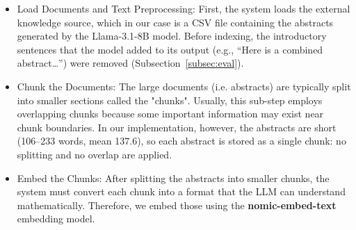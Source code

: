 \documentclass[bdcc,article,submit,pdftex,moreauthors]{Definitions/mdpi}
\newif\ifshowchanges
\newcommand{\commentRed}[1]{\textcolor{red}{#1}}
\newcommand{\commentVP}[1]{\textcolor{orange}{\textbf{VP:} #1}}
\newcommand{\commentGN}[1]{\textcolor{olive}{\textbf{GC:} #1}}
\newif\ifshowchanges
\begin{document}
\begin{itemize}
    \item Load Documents and Text Preprocessing: First, the system loads the external knowledge source, which in our case is a CSV file containing the abstracts generated by the Llama-3.1-8B model. 
    Before indexing, the introductory sentences that the model added to its output (e.g., ``Here is a combined abstract\ldots'') were removed (Subsection~\ref{subsec:eval}).

    \item Chunk the Documents: 
    The large documents (i.e. abstracts) are typically split into smaller sections called the "chunks". 
    Usually, this sub-step employs overlapping chunks because some important information may exist near chunk boundaries. 
    In our implementation, however, the abstracts are short (106--233 words, mean 137.6), so each abstract is stored as a single chunk: no splitting and no overlap are applied.

    \item Embed the Chunks: After splitting the abstracts into smaller chunks, the system must convert each chunk into a format that the LLM can understand mathematically. 
    Therefore, we embed those using the \textbf{nomic-embed-text} embedding model.
    

\end{itemize}
\end{document}

